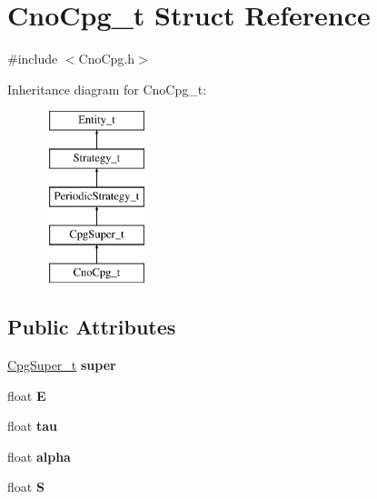 \hypertarget{structCnoCpg__t}{
\section{CnoCpg\_\-t Struct Reference}
\label{structCnoCpg__t}
}


{\ttfamily \#include $<$CnoCpg.h$>$}

Inheritance diagram for CnoCpg\_\-t:\begin{figure}[H]
\begin{center}
\leavevmode
\includegraphics[height=5.000000cm]{structCnoCpg__t}
\end{center}
\end{figure}
\subsection*{Public Attributes}
\begin{DoxyCompactItemize}
\item 
\hypertarget{structCnoCpg__t_a63a06575d9d87f4df750ba664cebd9e6}{
\hyperlink{structCpgSuper__t}{CpgSuper\_\-t} {\bfseries super}}
\label{structCnoCpg__t_a63a06575d9d87f4df750ba664cebd9e6}

\item 
\hypertarget{structCnoCpg__t_abf4e0776f09b677fb325a38092357fe0}{
float {\bfseries E}}
\label{structCnoCpg__t_abf4e0776f09b677fb325a38092357fe0}

\item 
\hypertarget{structCnoCpg__t_a097cafd33f3ef4612957cde820333731}{
float {\bfseries tau}}
\label{structCnoCpg__t_a097cafd33f3ef4612957cde820333731}

\item 
\hypertarget{structCnoCpg__t_ac3e4ce0d31e2a7abf71f7092582110a8}{
float {\bfseries alpha}}
\label{structCnoCpg__t_ac3e4ce0d31e2a7abf71f7092582110a8}

\item 
\hypertarget{structCnoCpg__t_acbdeb5591b38c7fa2eed05039dcf4210}{
float {\bfseries S}}
\label{structCnoCpg__t_acbdeb5591b38c7fa2eed05039dcf4210}

\end{DoxyCompactItemize}


